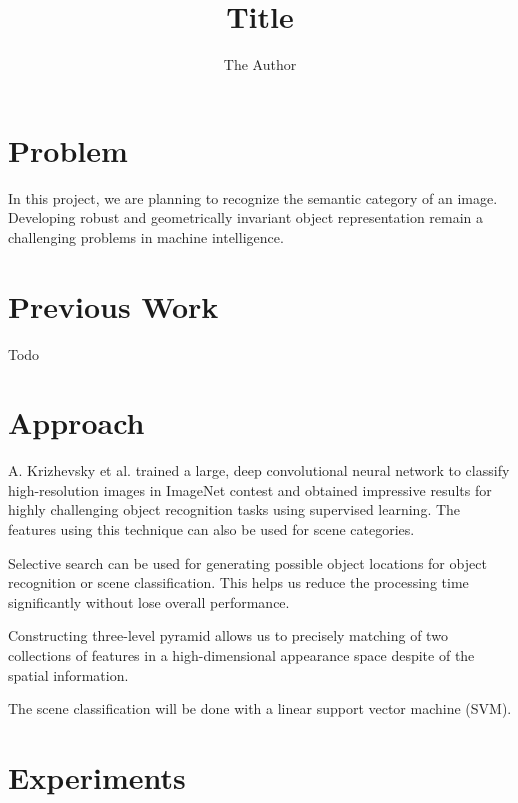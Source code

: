 \documentclass[11pt, oneside]{amsart} %
\title{Title}
\author{The Author}
\date{} %
\begin{document}
\maketitle

\section{Problem}
	In this project, we are planning to recognize the semantic category of an image. Developing robust and geometrically invariant object representation remain a challenging problems in machine intelligence. 

\section{Previous Work}
Todo

\section{Approach}
\par
A. Krizhevsky et al. trained a large, deep convolutional neural network to classify high-resolution images in ImageNet contest and obtained impressive results for highly challenging object recognition tasks using supervised learning. The features using this technique can also be used for scene categories. 

\par
Selective search can be used for generating possible object locations for object recognition or scene classification. This helps us reduce the processing time significantly without lose overall performance. 

\par	
Constructing three-level pyramid allows us to precisely matching of two collections of features in a high-dimensional appearance space despite of the spatial information.

\par
The scene classification will be done with a linear support vector machine (SVM).

\section{Experiments}
\end{document}
